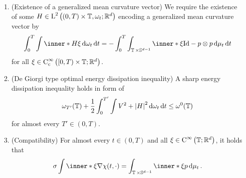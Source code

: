 \begin{definition}
\begin{enumerate}
		\item (Existence of a generalized mean curvature vector)
		We require the existence of some 
		$ H \in \operatorname{L}^{ 2 } \left( 
		( 0 , T ) \times \operatorname{\mathbb{T}} , \omega_{ t } ; \mathbb{ R }^{ d } \right) 
		$
		encoding a generalized mean curvature vector by
		\begin{equation}
			\label{equation_varifold_mean_curvature}
			\int_{ 0 }^{ T }
			\int
			\inner*{ H }{ \xi }
			\dd{ \omega_{ t } }
			\dd{ t }
			=
			-
			\int_{ 0 }^{ T }
			\int_{ \flattorus \times \mathbb{ S }^{ d - 1 } }
			\inner*{ \xi }{ \mathrm{Id} - p \otimes p }
			\dd{ \mu_{ t } }
			\dd{ t }
		\end{equation}
		for all $ \xi \in \operatorname{C}_{ \mathrm{c} }^{ \infty } \left( [ 0, T ) 
		\times \operatorname{\mathbb{T}} ; \mathbb{ R }^{ d } \right) $.
		
		\item (De Giorgi type optimal energy dissipation inequality)
		A sharp energy dissipation inequality holds in form of
		\begin{equation}
			\label{equation_varifold_de_giorgi_inequality}
			\omega_{ T' } ( \operatorname{\mathbb{T}} )
			+
			\frac{ 1 }{ 2 }
			\int_{ 0 }^{ T' }
			\int
			V^{ 2 }
			+
			\abs{ H }^{ 2 }
			\dd{ \omega_{ t } }
			\dd{ t }
			\leq
			\omega^{ 0 } ( \operatorname{\mathbb{T}} )
		\end{equation}
		for almost every $ T' \in ( 0 , T ) $.
		
		\item (Compatibility)
		For almost every $ t \in ( 0 , T ) $ and all $ \xi \in \operatorname{C}^{ 
			\infty } \left( \operatorname{\mathbb{T}} ; \mathbb{ R }^{ d } \right) $, it holds 
			that
		\begin{equation}
			\label{equation_varifold_compatibility}
			\sigma
			\int
			\inner*{ \xi }
			{ \nabla \chi ( t , \cdot ) }
			=
			\int_{ \flattorus \times \mathbb{ S }^{ d - 1 } }
			\inner*{ \xi }{ p }
			\dd{ \mu_{ t } }.
		\end{equation}
	\end{enumerate}
\end{definition}

